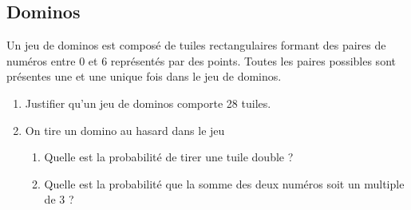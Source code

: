 \documentclass[oneside,12pt]{article}          %
\begin{document}
\subsection{Dominos}
\begin{minipage}{0.65\linewidth}
    Un jeu de dominos est composé de tuiles rectangulaires formant des paires de numéros entre 0 et 6 représentés par des points. Toutes les paires possibles sont présentes une et une unique fois dans le jeu de dominos.

    \begin{enumerate}
        \item Justifier qu'un jeu de dominos comporte 28 tuiles.
        \item On tire un domino au hasard dans le jeu
        \begin{enumerate}
            \item Quelle est la probabilité de tirer une tuile double ?
            \item Quelle est la probabilité que la somme des deux numéros soit un multiple de 3 ?
        \end{enumerate}
    \end{enumerate}
\end{minipage}\hfill
\end{document}
